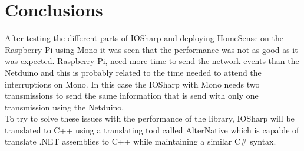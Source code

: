\section{Conclusions}\label{S:Results-overview}
After testing the different parts of IOSharp and deploying HomeSense on the Raspberry Pi using Mono it was seen that the performance was not as good as it was expected. Raspberry Pi, need more time to send the network events than the Netduino and this is probably related to the time needed to attend the interruptions on Mono. In this case the IOSharp with Mono needs two transmissions to send the same information that is send with only one transmission using the Netduino.
\\
To try to solve these issues with the performance of the library, IOSharp will be translated to C++ using a translating tool called AlterNative which is capable of translate .NET assemblies to C++ while maintaining a similar C\# syntax.
